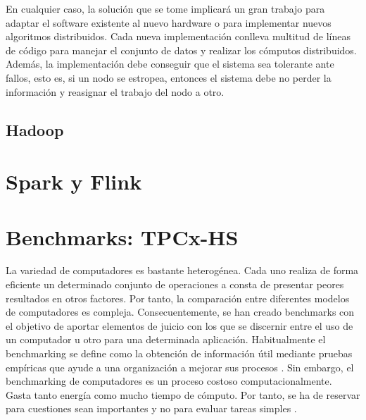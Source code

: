\documentclass[10pt]{article}
\begin{document}
		En cualquier caso, la solución que se tome implicará un gran trabajo para adaptar el software existente al nuevo hardware o para implementar nuevos algoritmos distribuidos. Cada nueva implementación conlleva multitud de líneas de código para manejar el conjunto de datos y realizar los cómputos distribuidos. Además, la implementación debe conseguir que el sistema sea tolerante ante fallos, esto es, si un nodo se estropea, entonces el sistema debe no perder la información y reasignar el trabajo del nodo a otro.

	\subsection{Hadoop}


\section{Spark y Flink} \label{sec:spark-flink}



\section{Benchmarks: TPCx-HS} \label{sec:tpcx-hs}

	La variedad de computadores es bastante heterogénea. Cada uno realiza de forma eficiente un determinado conjunto de operaciones a consta de presentar peores resultados en otros factores. Por tanto, la comparación entre diferentes modelos de computadores es compleja. Consecuentemente, se han creado benchmarks con el objetivo de aportar elementos de juicio con los que se discernir entre el uso de un computador u otro para una determinada aplicación. Habitualmente el benchmarking se define como la obtención de información útil mediante pruebas empíricas que ayude a una organización a mejorar sus procesos \cite{benchmarking}. Sin embargo, el benchmarking de computadores es un proceso costoso computacionalmente. Gasta tanto energía como mucho tiempo de cómputo. Por tanto, se ha de reservar para cuestiones sean importantes y no para evaluar tareas simples \cite{desv-bench}.
	
\end{document}
